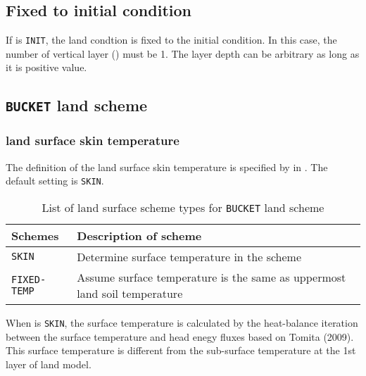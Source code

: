 \subsection{Fixed to initial condition}

If  is \verb|INIT|, the land condtion is fixed to the initial condition.
In this case, the number of vertical layer () must be 1.
The layer depth can be arbitrary as long as it is positive value.



\subsection{\texttt{BUCKET} land scheme}

\subsubsection{land surface skin temperature}

The definition of the land surface skin temperature is specified by  in .
The default setting is \verb|SKIN|.
%
\begin{table}[hbt]
\begin{center}
  \caption{List of land surface scheme types for \texttt{BUCKET} land scheme}
  \label{tab:nml_land_sfc}
  \begin{tabularx}{150mm}{lX} \hline
    \rowcolor[gray]{0.9}  Schemes & Description of scheme \\ \hline
      \verb|SKIN|       & Determine surface temperature in the scheme \\
      \verb|FIXED-TEMP| & Assume surface temperature is the same as uppermost land soil temperature \\
    \hline
  \end{tabularx}
\end{center}
\end{table}

When  is \verb|SKIN|,
the surface temperature is calculated by the heat-balance iteration
between the surface temperature and head enegy fluxes based on Tomita (2009).
This surface temperature is different from the sub-surface temperature at the 1st layer of land model.

